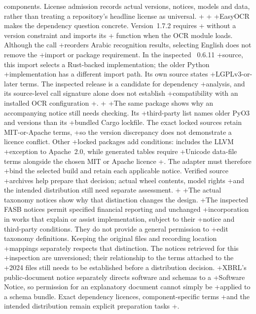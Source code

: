  components. License admission records actual versions, notices, models and
 data, rather than treating a repository's headline license as universal.
+
+\enlargethispage{\baselineskip}
+EasyOCR makes the dependency question concrete. Version~1.7.2 requires
+ without a version constraint and imports its
+ function when the OCR module loads. Although the call
+reorders Arabic recognition results, selecting English does not remove the
+import or package requirement. In the inspected ~0.6.11
+source, this import selects a Rust-backed implementation; the older Python
+implementation has a different import path. Its own source states
+LGPLv3-or-later terms. The inspected release is a candidate for dependency
+analysis, and its source-level call signature alone does not establish
+compatibility with an installed OCR configuration
+\citep{easyocr172source,pythonbidi0611source}.
+
+The same package shows why an accompanying notice still needs checking. Its
+third-party list names older PyO3 and  versions than its
+bundled Cargo lockfile. The exact locked sources retain MIT-or-Apache terms,
+so the version discrepancy does not demonstrate a licence conflict. Other
+locked packages add conditions:  includes the LLVM
+exception to Apache~2.0, while generated  tables require
+Unicode data-file terms alongside the chosen MIT or Apache licence
+\citep{pythonbidi0611source,bidirustsources2026}. The adapter must therefore
+bind the selected build and retain each applicable notice. Verified source
+archives help prepare that decision; actual wheel contents, model rights
+and the intended distribution still need separate assessment.
+
+The actual taxonomy notices show why that distinction changes the design.
+The inspected FASB notices permit specified financial reporting and unchanged
+incorporation in works that explain or assist implementation, subject to their
+notice and third-party conditions. They do not provide a general permission to
+edit taxonomy definitions. Keeping the original files and recording location
+mappings separately respects that distinction. The notices retrieved for this
+inspection are unversioned; their relationship to the terms attached to the
+2024 files still needs to be established before a distribution decision.
+XBRL's public-document notice separately directs software and schemas to a
+Software Notice, so permission for an explanatory document cannot simply be
+applied to a schema bundle. Exact dependency licences, component-specific terms
+and the intended distribution remain explicit preparation tasks
+\citep{fasbtaxonomyuses,fasbsrtuses,xbrlcopyright}.
